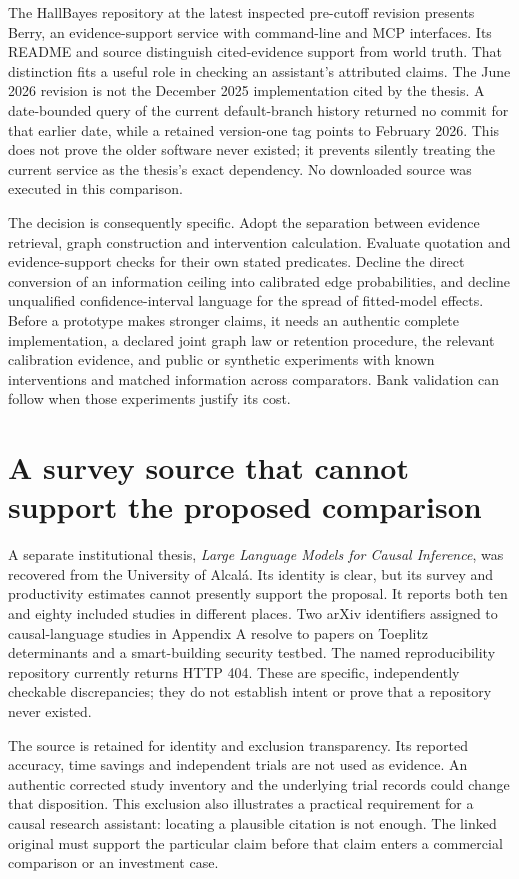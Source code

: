 The HallBayes repository at the latest inspected pre-cutoff revision presents
Berry, an evidence-support service with command-line and MCP interfaces.
Its README and source distinguish cited-evidence support from world truth.
That distinction fits a useful role in checking an assistant's attributed
claims. The June 2026 revision is not the December 2025 implementation cited
by the thesis. A date-bounded query of the current default-branch history
returned no commit for that earlier date, while a retained version-one tag
points to February 2026. This does not prove the older software never
existed; it prevents silently treating the current service as the thesis's
exact dependency. No downloaded source was executed in this comparison.
\citep{closure30berry}

The decision is consequently specific. Adopt the separation between
evidence retrieval, graph construction and intervention calculation.
Evaluate quotation and evidence-support checks for their own stated
predicates. Decline the direct conversion of an information ceiling into
calibrated edge probabilities, and decline unqualified confidence-interval
language for the spread of fitted-model effects. Before a prototype makes
stronger claims, it needs an authentic complete implementation, a declared
joint graph law or retention procedure, the relevant calibration evidence,
and public or synthetic experiments with known interventions and matched
information across comparators. Bank validation can follow when those
experiments justify its cost.

\section{A survey source that cannot support the proposed comparison}

A separate institutional thesis, \emph{Large Language Models for Causal
Inference}, was recovered from the University of Alcal\'a. Its identity is
clear, but its survey and productivity estimates cannot presently support
the proposal. It reports both ten and eighty included studies in different
places. Two arXiv identifiers assigned to causal-language studies in
Appendix A resolve to papers on Toeplitz determinants and a smart-building
security testbed. The named reproducibility repository currently returns
HTTP 404. These are specific, independently checkable discrepancies;
they do not establish intent or prove that a repository never existed.
\citep[Section 4.1, Tables 5--6 and 9, Section 5.4.3, Appendix A]
{closure30aitlhouss}

The source is retained for identity and exclusion transparency. Its reported
accuracy, time savings and independent trials are not used as evidence.
An authentic corrected study inventory and the underlying trial records
could change that disposition. This exclusion also illustrates a practical
requirement for a causal research assistant: locating a plausible citation
is not enough. The linked original must support the particular claim before
that claim enters a commercial comparison or an investment case.

